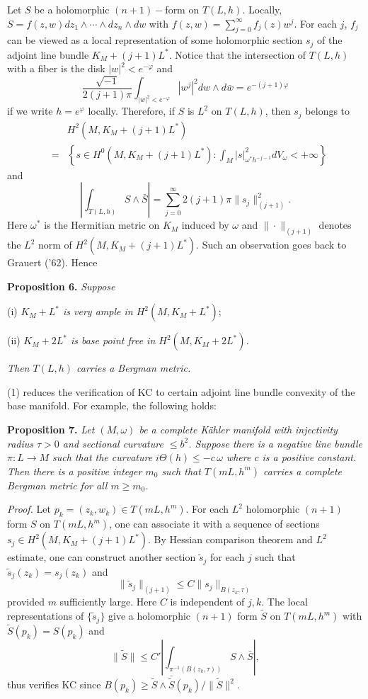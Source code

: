 \documentclass[12pt]{article}
\begin{document}
Let $S$ be a holomorphic $(n+1)-$form on $T(L,h)$. Locally,
$S=f(z,w)dz_1\wedge\cdots\wedge dz_n\wedge dw$ with
$f(z,w)=\sum_{j=0}^\infty f_j(z)w^j$. For each $j$, $f_j$ can be
viewed as a local representation of some holomorphic section $s_j$
of the adjoint line bundle $K_M+(j+1)L^\ast$. Notice that the
intersection of $T(L,h)$ with a fiber is the disk
$|w|^2<e^{-\varphi}$ and
$$
\frac{\sqrt{-1}}{2(j+1)\pi}\int_{|w|^2<e^{-\varphi}}|w^j|^2
dw\wedge d\bar{w}=e^{-(j+1)\varphi}
$$
if we write $h=e^{\varphi}$ locally. Therefore, if $S$ is $L^2$ on
$T(L,h)$, then $s_j$ belongs to
\begin{eqnarray*}
&& H^2(M,K_M+(j+1)L^\ast)\\
& = & \left\{s\in H^0(M,K_M+(j+1)L^\ast):\int_M |s|^2_{\omega^\ast
h^{-j-1}}dV_\omega<+\infty\right\}
\end{eqnarray*}
and
\begin{equation}
\left|\int_{T(L,h)}S\wedge \bar{S}\right|=\sum_{j=0}^\infty
2(j+1)\pi\|s_j\|^2_{(j+1)}.
\end{equation}
Here $\omega^\ast$ is the Hermitian metric on $K_M$ induced by
$\omega$ and $\|\cdot\|_{(j+1)}$ denotes the $L^2$ norm of
$H^2(M,K_M+(j+1)L^\ast)$. Such an observation goes back to Grauert
('62). Hence

\bigskip

\textbf{Proposition 6.} \emph{Suppose}

(i) \emph{$K_M+L^\ast$ is very ample in $H^2(M,K_M+L^\ast)$};

(ii) \emph{$K_M+2L^\ast$ is base point free in
$H^2(M,K_M+2L^\ast)$.}

\emph{Then $T(L,h)$ carries a Bergman metric.}

\bigskip


(1) reduces the verification of KC to certain adjoint line bundle
convexity of the base manifold. For example, the following holds:

\bigskip

\textbf{Proposition 7.} \emph{Let $(M,\omega)$ be a complete
K\"ahler manifold with injectivity radius $\tau>0$ and sectional
curvature $\le b^2$. Suppose there is a negative line bundle
$\pi:L\rightarrow M$ such that the curvature $ i\Theta(h)\le -
c\,\omega$ where $c$ is a positive constant. Then there is a
positive integer $m_0$ such that $T(mL,h^m)$ carries a complete
Bergman metric for all $m\ge m_0$.}

\bigskip

\emph{Proof.} Let $p_k=(z_k,w_k)\in T(mL,h^m)$. For each $L^2$
holomorphic $(n+1)$ form $S$ on $T(mL,h^m)$, one can associate it
with a sequence of sections $s_j\in H^2(M,K_M+(j+1)L^\ast)$. By
Hessian comparison theorem and $L^2$ estimate, one can construct
another section $\tilde{s}_j$ for each $j$ such that
$\tilde{s}_j(z_k)=s_j(z_k)$ and
$$
\|\tilde{s}_j\|_{(j+1)}\le C \|s_j\|_{B(z_k,\tau)}
$$
provided $m$ sufficiently large. Here $C$ is independent of $j,k$.
The local representations of $\{\tilde{s}_j\}$ give a holomorphic
$(n+1)$ form $\tilde{S}$ on $T(mL,h^m)$ with
$\tilde{S}(p_k)=S(p_k)$ and
$$
\|\tilde{S}\|\le C'|\int_{\pi^{-1}(B(z_k,\tau))} S\wedge \bar{S}|,
$$
thus verifies KC since $B(p_k)\ge \tilde{S}\wedge
\bar{\tilde{S}}(p_k)/\|\tilde{S}\|^2$.
\end{document}
